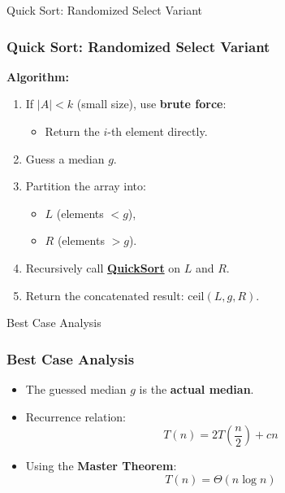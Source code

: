 \documentclass[10pt,aspectratio=43]{beamer}
\begin{document}
\begin{frame}{Quick Sort: Randomized Select Variant}
\frametitle{Quick Sort: Randomized Select Variant}
\textbf{Algorithm:}
\begin{enumerate}
    \item If \( |A| < k \) (small size), use \textbf{brute force}:
        \begin{itemize}
            \item Return the \( i \)-th element directly.
        \end{itemize}
    \item Guess a median \( g \).
    \item Partition the array into:
        \begin{itemize}
            \item \( L \) (elements \( < g \)),
            \item \( R \) (elements \( > g \)).
        \end{itemize}
\item Recursively call \textbf{\textcolor{blue}{\href{https://drive.google.com/file/d/1-il0i8t0XW9ubEFkQk3HtQUox8EorSX-/view}{QuickSort}}} on \( L \) and \( R \).
\item Return the concatenated result: \( \text{ceil}(L, g, R) \).
\end{enumerate}

\end{frame}


\begin{frame}{Best Case Analysis}
\frametitle{Best Case Analysis}
\begin{itemize}
    \item The guessed median \( g \) is the \textbf{actual median}.
    \item Recurrence relation:
        \[
        T(n) = 2T\left(\frac{n}{2}\right) + cn
        \]
    \item Using the \textbf{Master Theorem}:
        \[
        T(n) = \Theta(n \log n)
        \]
\end{itemize}
\end{frame}
\end{document}
